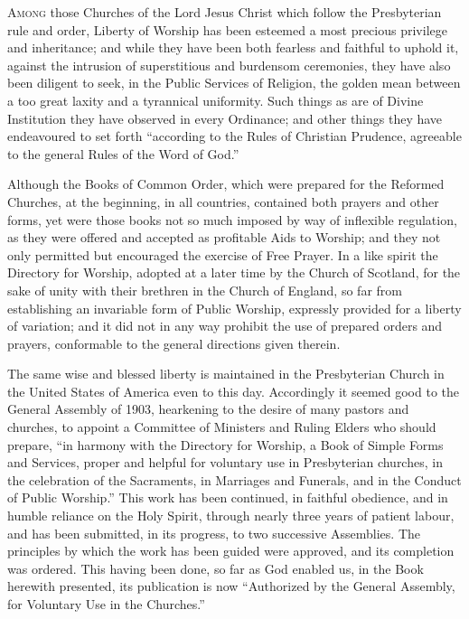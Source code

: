 \lettrine{A}{mong} those Churches of the Lord Jesus Christ which follow the Presbyterian rule and order, Liberty of Worship has been esteemed a most precious privilege and inheritance; and while they have been both fearless and faithful to uphold it, against the intrusion of superstitious and burdensom ceremonies, they have also been diligent to seek, in the Public Services of Religion, the golden mean between a too great laxity and a tyrannical uniformity.
Such things as are of Divine Institution they have observed in every Ordinance; and other things they have endeavoured to set forth ``according to the Rules of Christian Prudence, agreeable to the general Rules of the Word of God.''

Although the Books of Common Order, which were prepared for the Reformed Churches, at the beginning, in all countries, contained both prayers and other forms, yet were those books not so much imposed by way of inflexible regulation, as they were offered and accepted as profitable Aids to Worship; and they not only permitted but encouraged the exercise of Free Prayer.
In a like spirit the Directory for Worship, adopted at a later time by the Church of Scotland, for the sake of unity with their brethren in the Church of England, so far from establishing an invariable form of Public Worship, expressly provided for a liberty of variation; and it did not in any way prohibit the use of prepared orders and prayers, conformable to the general directions given therein.

The same wise and blessed liberty is maintained in the Presbyterian Church in the United States of America even to this day.
Accordingly it seemed good to the General Assembly of 1903, hearkening to the desire of many pastors and churches, to appoint a Committee of Ministers and Ruling Elders who should prepare, ``in harmony with the Directory for Worship, a Book of Simple Forms and Services, proper and helpful for voluntary use in Presbyterian churches, in the celebration of the Sacraments, in Marriages and Funerals, and in the Conduct of Public Worship.''
This work has been continued, in faithful obedience, and in humble reliance on the Holy Spirit, through nearly three years of patient labour, and has been submitted, in its progress, to two successive Assemblies.
The principles by which the work has been guided were approved, and its completion was ordered.
This having been done, so far as God enabled us, in the Book herewith presented, its publication is now ``Authorized by the General Assembly, for Voluntary Use in the Churches.''

